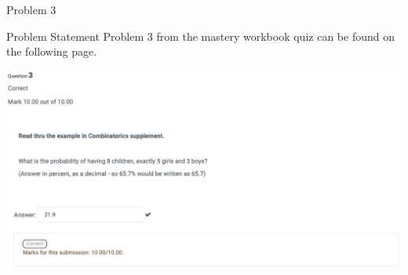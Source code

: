 \begin{problem}{Problem 3}
    \begin{statement}{Problem Statement}
        Problem 3 from the mastery workbook quiz can be found on the following page.
    \end{statement}
    \begin{Highlight}[Solution]
        \begin{center}
            \includegraphics[width = 1.0\textwidth]{Images/Problem 3.png}
        \end{center}
    \end{Highlight}
\end{problem}

